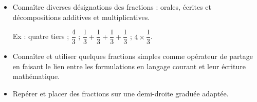 \begin{prerequis}    
    \begin{itemize}                
        \item[\emoji{red-heart}] Connaître diverses désignations des fractions : orales, écrites et décompositions additives et multiplicatives.
        
        \smallskip
        Ex : quatre tiers ; $\dfrac43$ ; $\dfrac13 + \dfrac13 + \dfrac13 + \dfrac13$ ; $4 \times \dfrac13$.
        \item[\emoji{red-heart}] Connaître et utiliser quelques fractions simples comme opérateur de partage en faisant le lien entre les formulations en langage courant et leur écriture mathématique.
        \columnbreak
        \item[\emoji{diamond-suit}] Repérer et placer des fractions sur une demi-droite graduée adaptée.
    \end{itemize}
\end{prerequis}
